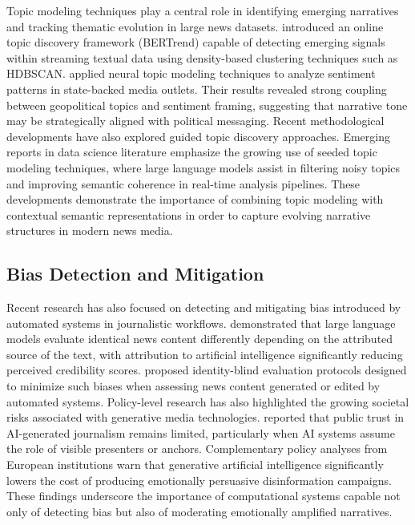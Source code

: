 \documentclass[final,1p,times]{elsarticle}
\begin{document}
Topic modeling techniques play a central role in identifying emerging narratives and tracking thematic evolution in large news datasets. \cite{boutaleb2024bertrend} introduced an online topic discovery framework (BERTrend) capable of detecting emerging signals within streaming textual data using density-based clustering techniques such as HDBSCAN. \cite{schweizer2025political} applied neural topic modeling techniques to analyze sentiment patterns in state-backed media outlets. Their results revealed strong coupling between geopolitical topics and sentiment framing, suggesting that narrative tone may be strategically aligned with political messaging. Recent methodological developments have also explored guided topic discovery approaches. Emerging reports in data science literature emphasize the growing use of seeded topic modeling techniques, where large language models assist in filtering noisy topics and improving semantic coherence in real-time analysis pipelines. These developments demonstrate the importance of combining topic modeling with contextual semantic representations in order to capture evolving narrative structures in modern news media.

\subsection{Bias Detection and Mitigation}

Recent research has also focused on detecting and mitigating bias introduced by automated systems in journalistic workflows. \cite{germani2025source} demonstrated that large language models evaluate identical news content differently depending on the attributed source of the text, with attribution to artificial intelligence significantly reducing perceived credibility scores. \cite{startari2025ethos} proposed identity-blind evaluation protocols designed to minimize such biases when assessing news content generated or edited by automated systems. Policy-level research has also highlighted the growing societal risks associated with generative media technologies. \cite{newman2025digital} reported that public trust in AI-generated journalism remains limited, particularly when AI systems assume the role of visible presenters or anchors. Complementary policy analyses from European institutions warn that generative artificial intelligence significantly lowers the cost of producing emotionally persuasive disinformation campaigns. These findings underscore the importance of computational systems capable not only of detecting bias but also of moderating emotionally amplified narratives.
\end{document}
